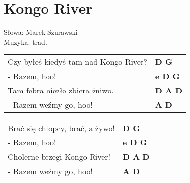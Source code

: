 \section{Kongo River}

Słowa: Marek Szurawski\\
Muzyka: trad.

\vspace{2em}
\begin{tabular}{@{}p{7cm}@{}l@{}}
Czy byłeś kiedyś tam nad Kongo River? & \bfseries D G\\
- Razem, hoo! & \bfseries e D G\\
Tam febra niezłe zbiera żniwo. & \bfseries D A D\\
- Razem weźmy go, hoo! & \bfseries A D\\
\end{tabular}

\vspace{1em}
\begin{tabular}{@{}p{7cm}@{}l@{}}
Brać się chłopcy, brać, a żywo! & \bfseries D G\\
- Razem, hoo! & \bfseries e D G\\
Cholerne brzegi Kongo River! & \bfseries D A D\\
- Razem weźmy go, hoo! & \bfseries A D\\
\end{tabular}


